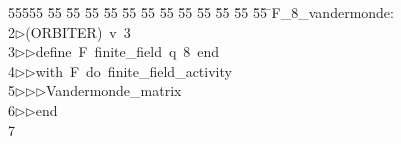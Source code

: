 %
%
\begin{tabbing}
55555 \= 55 \= 55 \= 55 \= 55 \= 55 \= 55 \= 55 \= 55 \= 55 \= 55 \= 55 \= 55 \= \>F\_8\_vandermonde:\\[0pt]
2\>$\triangleright$\>(ORBITER)\ v\ 3\ \\[0pt]
3\>$\triangleright$\>$\triangleright$\>define\ F\ finite\_field\ q\ 8\ end\ \\[0pt]
4\>$\triangleright$\>$\triangleright$\>with\ F\ do\ finite\_field\_activity\ \\[0pt]
5\>$\triangleright$\>$\triangleright$\>$\triangleright$\>Vandermonde\_matrix\ \\[0pt]
6\>$\triangleright$\>$\triangleright$\>end\\[0pt]
7\>\end{tabbing}
